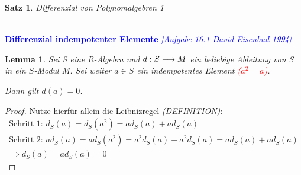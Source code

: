 \documentclass[10pt,a4paper]{report}
\newcommand{\comment}[1]{}
\newcommand{\ModulsOfDifferenzials}{David Eisenbud 1994}
\newcounter{Aussage}[chapter]
\newtheorem{satz}[Aussage]{Satz}
\newtheorem{lemma}[Aussage]{Lemma}
\newcommand{\functionfront}[3]{\nolinebreak{#1:#2 \longrightarrow #3}}
\newcommand{\divf}[1]{d_{#1}}
\begin{document}
\begin{satz}\label{Differenzial von Polynomalgebren 1}
Differenzial von Polynomalgebren 1
\end{satz}


\ \\
\textcolor{blue}{\textbf{Differenzial indempotenter Elemente} \textit{[Aufgabe 16.1 \ModulsOfDifferenzials]}}
\begin{lemma}\label{Differenzial indempotenter Elemente}
Sei S eine R-Algebra und $\functionfront{d}{S}{M}$ ein beliebige Ableitung von S in ein $S$-Modul $M$. Sei weiter $a \in S$ ein indempotentes Element \textcolor{red}{($a^2 = a$)}.\\
\begin{center}
Dann gilt $d(a) = 0$. 
\end{center}
\end{lemma}
\begin{proof}
Nutze hierfür allein die Leibnizregel \textit{(DEFINITION)}: \comment{\label{*Definition Leibnizregel}}  
\begin{gather*}
\text{Schritt 1: } \divf{S}(a) = \divf{S}(a^2) = a\divf{S}(a) + a\divf{S}(a) \\
\text{Schritt 2: } a\divf{S}(a) = a\divf{S}(a^2) = a^2\divf{S}(a) + a^2\divf{S}(a) = a\divf{S}(a) + a\divf{S}(a)\\
\Rightarrow \divf{S}(a) = a\divf{S}(a) = 0
\end{gather*}
\end{proof}
\end{document}
